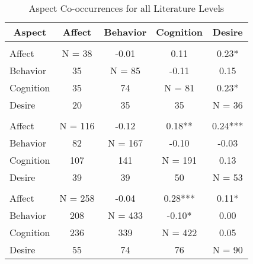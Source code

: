 \begin{table}
\begin{minipage}[t][\textheight][t]{\textwidth}

\caption{\label{tab:CombinedCooccurrences}Aspect Co-occurrences for all Literature Levels}
\begin{tabular}[t]{lcccc}
\toprule
\multicolumn{1}{c}{Aspect} & Affect & Behavior & Cognition & Desire\\
\midrule
\addlinespace[0.3em]
\multicolumn{5}{l}{\textbf{Theoretical}}\\
\hspace{1em}Affect & N = 38 & -0.01 & 0.11 & 0.23*\\
\hspace{1em}Behavior & 35 & N = 85 & -0.11 & 0.15\\
\hspace{1em}Cognition & 35 & 74 & N = 81 & 0.23*\\
\hspace{1em}Desire & 20 & 35 & 35 & N = 36\\
\addlinespace[0.3em]
\multicolumn{5}{l}{\textbf{Methodological}}\\
\hspace{1em}Affect & N = 116 & -0.12 & 0.18** & 0.24***\\
\hspace{1em}Behavior & 82 & N = 167 & -0.10 & -0.03\\
\hspace{1em}Cognition & 107 & 141 & N = 191 & 0.13\\
\hspace{1em}Desire & 39 & 39 & 50 & N = 53\\
\addlinespace[0.3em]
\multicolumn{5}{l}{\textbf{Empirical}}\\
\hspace{1em}Affect & N = 258 & -0.04 & 0.28*** & 0.11*\\
\hspace{1em}Behavior & 208 & N = 433 & -0.10* & 0.00\\
\hspace{1em}Cognition & 236 & 339 & N = 422 & 0.05\\
\hspace{1em}Desire & 55 & 74 & 76 & N = 90\\
\bottomrule
\end{tabular}
\end{minipage}
\end{table}
